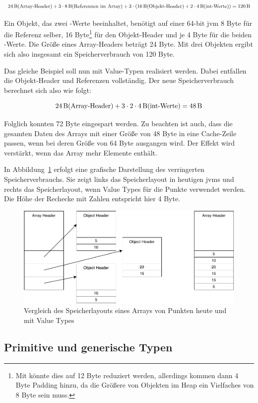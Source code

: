 \[ \SI{24}{\byte} \text{(Array-Header)} + 3 \cdot \SI{8}{\byte} \text{(Referenzen im Array)} + 3 \cdot (\SI{16}{\byte} \text{(Objekt-Header)} + 2 \cdot \SI{4}{\byte} \text{(int-Werte)}) = \SI{120}{\byte} \]

Ein Objekt, das zwei -Werte beeinhaltet, benötigt auf einer 64-bit \ac{jvm} 8 Byte für die Referenz selber, 16 Byte\footnote{Mit  könnte dies auf 12 Byte reduziert werden, allerdings kommen dann 4 Byte Padding hinzu, da die Größere von Objekten im Heap ein Vielfaches von 8 Byte sein muss.} für den Objekt-Header und je 4 Byte für die beiden -Werte.
Die Größe eines Array-Headers beträgt 24 Byte.
Mit drei Objekten ergibt sich also insgesamt ein Speicherverbrauch von 120 Byte.

Das gleiche Beispiel soll nun mit Value-Typen realisiert werden.
Dabei entfallen die Objekt-Header und Referenzen vollständig.
Der neue Speicherverbrauch berechnet sich also wie folgt:

\[ \SI{24}{\byte} \text{(Array-Header)} + 3 \cdot 2 \cdot \SI{4}{\byte} \text{(int-Werte)} = \SI{48}{\byte} \]

Folglich konnten 72 Byte eingespart werden.
Zu beachten ist auch, dass die gesamten Daten des Arrays mit einer Größe von 48 Byte in eine Cache-Zeile passen, wenn bei deren Größe von 64 Byte ausgangen wird.
Der Effekt wird verstärkt, wenn das Array mehr Elemente enthält.

In Abbildung~\ref{fig:memory-usage} erfolgt eine grafische Darstellung des verringerten Speicherverbrauchs.
Sie zeigt links das Speicherlayout in heutigen \acp{jvm} und rechts das Speicherlayout, wenn Value Types für die Punkte verwendet werden.
Die Höhe der Rechecke mit Zahlen entspricht hier 4 Byte.

\begin{figure}
    \centering
    \includegraphics{img/memory-usage.pdf}
    \caption{Vergleich des Speicherlayouts eines Arrays von Punkten heute und mit Value Types}
    \label{fig:memory-usage}
\end{figure}

\subsection{Primitive und generische Typen}\label{subsec:primitive-generics}
